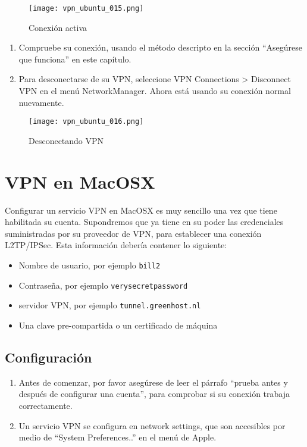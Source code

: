 \documentclass[10pt,a5paper,twoside,,]{book}
\providecommand{\tightlist}{%
  \setlength{\itemsep}{0pt}\setlength{\parskip}{0pt}}
\begin{document}
\begin{figure}[htbp]
\centering
\texttt{[image: vpn\_ubuntu\_015.png]}
\caption{Conexión activa}
\end{figure}

\begin{enumerate}
\def\labelenumi{\arabic{enumi}.}
\setcounter{enumi}{2}
\item
  Compruebe su conexión, usando el método descripto en la sección
  ``Asegúrese que funciona'' en este capítulo.
\item
  Para desconectarse de su VPN, seleccione VPN Connections
  \textgreater{} Disconnect VPN en el menú NetworkManager. Ahora está
  usando su conexión normal nuevamente.
\end{enumerate}

\begin{figure}[htbp]
\centering
\texttt{[image: vpn\_ubuntu\_016.png]}
\caption{Desconectando VPN}
\end{figure}

\chapter{VPN en MacOSX}\label{vpn-en-macosx}

Configurar un servicio VPN en MacOSX es muy sencillo una vez que tiene
habilitada su cuenta. Supondremos que ya tiene en su poder las
credenciales suministradas por su proveedor de VPN, para establecer una
conexión L2TP/IPSec. Esta información debería contener lo siguiente:

\begin{itemize}
\tightlist
\item
  Nombre de usuario, por ejemplo \texttt{bill2}
\item
  Contraseña, por ejemplo \texttt{verysecretpassword}
\item
  servidor VPN, por ejemplo \texttt{tunnel.greenhost.nl}
\item
  Una clave pre-compartida o un certificado de máquina
\end{itemize}

\section{Configuración}\label{configuraciuxf3n-1}

\begin{enumerate}
\def\labelenumi{\arabic{enumi}.}
\item
  Antes de comenzar, por favor asegúrese de leer el párrafo ``prueba
  antes y después de configurar una cuenta'', para comprobar si su
  conexión trabaja correctamente.
\item
  Un servicio VPN se configura en network settings, que son accesibles
  por medio de ``System Preferences..'' en el menú de Apple.
\end{enumerate}
\end{document}
